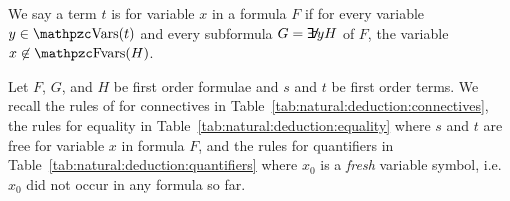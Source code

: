 




\begin{definition}
	We say a term \( t \) is  for variable \( x \)
	in a formula \( F \) if for every variable \( y \in \var(t) \)
	and every subformula \( G = \quantify y H \) of \( F \),
	the variable \( x \not\in\fvar(H) \).
\end{definition}



\begin{definition}\label{def:natural:deduction}
	Let \( F \), \( G \), and \( H \) be first order formulae and
	\(s\) and \(t\) be first order terms.
	We recall the rules of  for connectives
	in Table~\ref{tab:natural:deduction:connectives},
	the rules for equality in Table~\ref{tab:natural:deduction:equality}
	where \( s \) and \( t \) are free for variable \( x \) in formula \( F \),
	and the rules for quantifiers in
	Table~\ref{tab:natural:deduction:quantifiers}
	where
	\( x_0 \) is a \emph{fresh} variable symbol,
	i.e.~\( x_0 \) did not occur in any formula so far.
\end{definition}





